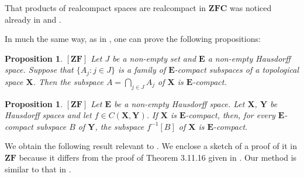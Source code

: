 \documentclass[12pt,twoside,leqno]{article}
\theoremstyle{plain}
\newtheorem{proposition}[theorem]{Proposition}
\theoremstyle{definition}
\theoremstyle{remark}
\begin{document}
That products of realcompact spaces are realcompact in $\mathbf{ZFC}$ was noticed already in \cite{com} and  \cite{sal}.

In much the same way, as in \cite[proofs of Corollaries 3.11.17 and 2.11.18]{en}, one can prove the following propositions:

\begin{proposition}
	\label{s4:p6}
	$[\mathbf{ZF}]$ Let $J$ be a non-empty set and $\mathbf{E}$ a non-empty Hausdorff space. Suppose that $\{A_j: j\in J\}$ is a family of $\mathbf{E}$-compact subspaces of a topological space $\mathbf{X}$.  Then the subspace $A=\bigcap\limits_{j\in J}A_j$ of $\mathbf{X}$ is $\mathbf{E}$-compact.
\end{proposition}

\begin{proposition}
	\label{s4:p7}
	$[\mathbf{ZF}]$ Let $\mathbf{E}$ be a non-empty Hausdorff space. Let $\mathbf{X}$, $\mathbf{Y}$ be Hausdorff spaces and let $f\in C(\mathbf{X}, \mathbf{Y})$. If $\mathbf{X}$ is  $\mathbf{E}$-compact, then, for every $\mathbf{E}$-compact subspace $B$ of $\mathbf{Y}$, the subspace $f^{-1}[B]$ of $\mathbf{X}$ is $\mathbf{E}$-compact. 
\end{proposition}

We obtain the following result relevant to \cite[Theorem 3.11.16]{en}. We enclose a sketch of a proof of it in $\mathbf{ZF}$ because it differs from the proof of Theorem 3.11.16 given in \cite{en}. Our method is similar to that in \cite[the proof of Theorem 2.1]{mr2}.
\end{document}
